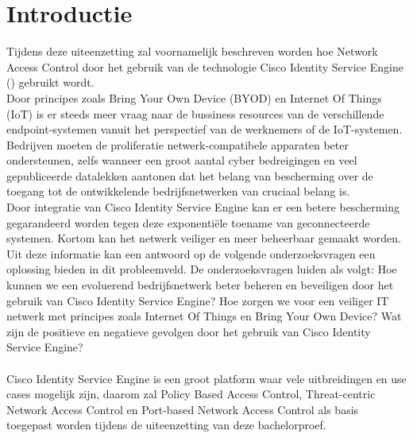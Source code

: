 
\section{Introductie} %
\label{sec:introductie}
Tijdens deze uiteenzetting zal voornamelijk beschreven worden hoe Network Access Control door het gebruik van de technologie Cisco Identity Service Engine (\cite{CiscoISE}) gebruikt wordt.\\Door principes zoals Bring Your Own Device (BYOD) en Internet Of Things (IoT) is er steeds meer vraag naar de bussiness resources van de verschillende endpoint-systemen vanuit het perspectief van de werknemers of de IoT-systemen. Bedrijven moeten de proliferatie netwerk-compatibele apparaten beter ondersteunen, zelfs wanneer een groot aantal cyber bedreigingen en veel gepubliceerde datalekken aantonen dat het belang van bescherming over de toegang tot de ontwikkelende bedrijfsnetwerken van cruciaal belang is.\\Door integratie van Cisco Identity Service Engine kan er een betere bescherming gegarandeerd worden tegen deze exponentiële toename van geconnecteerde systemen. Kortom kan het netwerk veiliger en meer beheerbaar gemaakt worden. Uit deze informatie kan een antwoord op de volgende onderzoeksvragen een oplossing bieden in dit probleemveld. De onderzoeksvragen luiden als volgt: Hoe kunnen we een evoluerend bedrijfsnetwerk beter beheren en beveiligen door het gebruik van Cisco Identity Service Engine? Hoe zorgen we voor een veiliger IT netwerk met principes zoals Internet Of Things en Bring Your Own Device? Wat zijn de positieve en negatieve gevolgen door het gebruik van Cisco Identity Service Engine?\\ \\Cisco Identity Service Engine is een groot platform waar vele uitbreidingen en use cases mogelijk zijn, daarom zal Policy Based Access Control, Threat-centric Network Access Control en Port-based Network Access Control als basis toegepast worden tijdens de uiteenzetting van deze bachelorproef.

\pagebreak
